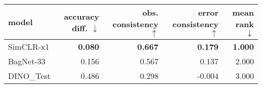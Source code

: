 \begin{tabular}{lrrrr}
\toprule
     model & accuracy diff. $\downarrow$ & obs. consistency $\uparrow$ & error consistency $\uparrow$ & mean rank $\downarrow$ \\
\midrule
 SimCLR-x1 &              \textbf{0.080} &              \textbf{0.667} &               \textbf{0.179} &         \textbf{1.000} \\
 BagNet-33 &                       0.156 &                       0.567 &                        0.137 &                  2.000 \\
DINO\_Test &                       0.486 &                       0.298 &                       -0.004 &                  3.000 \\
\bottomrule
\end{tabular}

